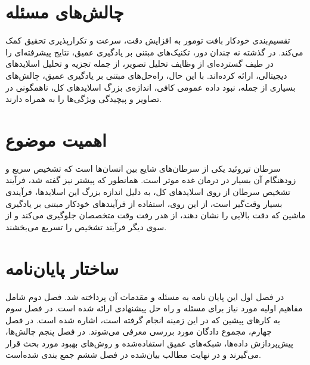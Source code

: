 \section{چالش‌های مسئله}\label{sec:چالش‌های مسئله}
تقسیم‌بندی خودکار بافت تومور به افزایش دقت، سرعت و تکرارپذیری تحقیق کمک می‌کند. در گذشته نه چندان دور، تکنیک‌های مبتنی بر یادگیری عمیق، نتایج پیشرفته‌ای را در طیف گسترده‌ای از وظایف تحلیل تصویر، از جمله تجزیه و تحلیل اسلایدهای دیجیتالی، ارائه کرده‌اند. با این حال، راه‌حل‌های مبتنی بر یادگیری عمیق، چالش‌های بسیاری از جمله، نبود داده عمومی کافی، اندازه‌ی بزرگ اسلاید‌های کل، ناهمگونی در تصاویر و پیچیدگی ویژگی‌ها را به همراه دارند.



\section{اهمیت موضوع}\label{sec:اهمیت موضوع}
سرطان تیروئید یکی از سرطان‌های شایع بین انسان‌ها است که تشخیص سریع و زودهنگام آن بسیار در درمان غده موثر است.
همانطور که پیشتر نیز گفته شد، فرآیند تشخیص سرطان از روی اسلاید‌های کل، به دلیل اندازه بزرگ این اسلایدها، فرآیندی بسیار وقت‌گیر است، از این روی، استفاده از فرآیند‌های خودکار مبتنی بر یادگیری ماشین که دقت بالایی را نشان دهند، از هدر رفت وقت متخصصان جلوگیری می‌کند و از سوی دیگر فرآیند تشخیص را تسریع می‌بخشند.


\section{ساختار پایان‌نامه}\label{sec:ساختار پایان‌نامه}
در فصل اول این پایان نامه به مسئله و مقدمات آن پرداخته شد.
فصل دوم شامل مفاهیم اولیه مورد نیاز برای مسئله و راه حل پیشنهادی ارائه شده است.
در فصل سوم به کارهای پیشین که در این زمینه انجام گرفته است، اشاره شده است.
در فصل چهارم، مجموع دادگان مورد بررسی معرفی می‌شوند.
در فصل پنجم چالش‌ها، پیش‌پردازش داده‌ها، شبکه‌های عمیق استفاده‌شده و روش‌های بهبود مورد بحث قرار می‌گیرند و در نهایت مطالب بیان‌شده در فصل ششم جمع بندی شده‌است.
 


